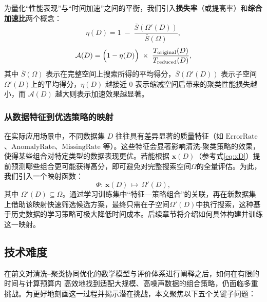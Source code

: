 \documentclass[10pt]{article} %
\numberwithin{equation}{section}
\begin{document}
为量化“性能表现”与“时间加速”之间的平衡，我们引入\textbf{损失率}（或提高率）和\textbf{综合加速比}两个概念：
\begin{equation}\label{eq:loss-rate}
  \eta(D)
  =
  1 \;-\;
  \frac{\bar{S}(\Omega'(D))}{\bar{S}(\Omega)},
\end{equation}
\begin{equation}\label{eq:acc-ratio}
  \mathcal{A}(D)
  =
  \Bigl(1 - \eta(D)\Bigr)
  \;\times\;
  \frac{T_{\text{original}}(D)}{T_{\text{reduced}}(D)},
\end{equation}
其中 \(\bar{S}(\Omega)\) 表示在完整空间上搜索所得的平均得分，\(\bar{S}(\Omega'(D))\) 表示子空间\(\Omega'(D)\)上的平均得分，\(\eta(D)\) 越接近 0 表示缩减空间后带来的聚类性能损失越小，而 \(\mathcal{A}(D)\) 越大则表示加速效果越显著。

\subsubsection{从数据特征到优选策略的映射}
在实际应用场景中，不同数据集 \(D\) 往往具有差异显著的质量特征（如 \(\mathrm{ErrorRate}\)、\(\mathrm{AnomalyRate}\)、\(\mathrm{MissingRate}\) 等）。这些特征会显著影响清洗-聚类策略的效果，使得某些组合对特定类型的数据表现更优。若能根据 \(\mathbf{x}(D)\)（参考式\ref{eq:xD}）提前预测哪些组合更可能获得高分，即可避免对完整搜索空间\(\Omega\)的全量评估。为此，我们引入一个映射函数：
\begin{equation}\label{eq:Omega-prime}
  \Phi:\, \mathbf{x}(D)\,\mapsto\, \Omega'(D),
\end{equation}
其中 \(\Omega'(D)\subseteq \Omega\)。通过学习训练集中“特征—策略组合”的关联，再在新数据集上借助该映射快速筛选候选方案，最终只需在子空间\(\Omega'(D)\)中执行搜索，这种基于历史数据的学习策略可极大降低时间成本\cite{10.14778/3407790.3407801}。后续章节将介绍如何具体构建并训练这一映射。

\subsection{技术难度}
\label{subsec:problem-statement}

在前文对清洗–聚类协同优化的数学模型与评价体系进行阐释之后，如何在有限的时间与计算预算内 高效地找到适配大规模、高噪声数据的组合策略，仍面临多重挑战。为更好地刻画这一过程并揭示潜在挑战，本文聚焦以下五个关键子问题：
\end{document}
